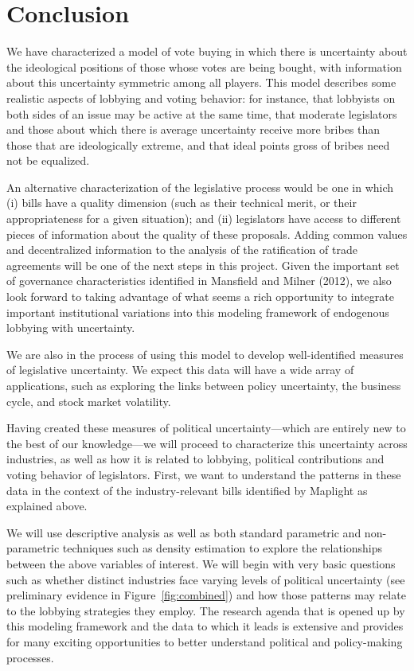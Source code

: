\documentclass[12pt]{article}
\begin{document}
\section{Conclusion}
\label{sec:concl}

We have characterized a model of vote buying in which there is uncertainty about the ideological positions of those whose votes are being bought, with information about this uncertainty symmetric among all players. This model describes some realistic aspects of lobbying and voting behavior: for instance, that lobbyists on both sides of an issue may be active at the same time, that moderate legislators and those about which there is average uncertainty receive more bribes than those that are ideologically extreme, and that ideal points gross of bribes need not be equalized.

An alternative characterization of the legislative process would be one in which (i) bills have a quality dimension (such as their technical merit, or their appropriateness for a given situation); and (ii) legislators have access to different pieces of information about the quality of these proposals. Adding common values and decentralized information to the analysis of the ratification of trade agreements will be one of the next steps in this project. Given the important set of governance characteristics identified in Mansfield and Milner (2012), we also look forward to taking advantage of what seems a rich opportunity to integrate important institutional variations into this modeling framework of endogenous lobbying with uncertainty.

We are also in the process of using this model to develop well-identified measures of legislative uncertainty. We expect this data will have a wide array of applications, such as exploring the links between policy uncertainty, the business cycle, and stock market volatility.

Having created these measures of political uncertainty---which are entirely new to the best of our knowledge---we will proceed to characterize this uncertainty across industries, as well as how it is related to lobbying, political contributions and voting behavior of legislators. First, we want to understand the patterns in these data in the context of the industry-relevant bills identified by Maplight as explained above.

We will use descriptive analysis as well as both standard parametric and non-parametric techniques such as density estimation to explore the relationships between the above variables of interest. We will begin with very basic questions such as whether distinct industries face varying levels of political uncertainty (see preliminary evidence in Figure~\ref{fig:combined}) and how those patterns may relate to the lobbying strategies they employ. The research agenda that is opened up by this modeling framework and the data to which it leads is extensive and provides for many exciting opportunities to better understand political and policy-making processes.
\end{document}
